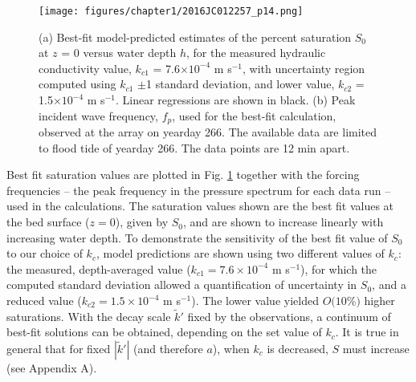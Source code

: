 \begin{figure} %
		\begin{center}	
		\noindent\texttt{[image: figures/chapter1/2016JC012257\_p14.png]}
	\caption[Best-fit saturation values: flood tide]{(a) Best-fit model-predicted estimates of the percent saturation $S_0$ at $z$ = 0 versus water depth $h$, for the measured hydraulic conductivity value, $k_{c1}$ = 7.6$\times10^{-4}$ m s$^{-1}$, with uncertainty region computed using $k_{c1}$ $\pm$1 standard deviation, and lower value, $k_{c2}$ = 1.5$\times10^{-4}$ m s$^{-1}$. Linear regressions are shown in black. (b) Peak incident wave frequency, $f_{p}$, used for the best-fit calculation, observed at the array on yearday 266. The available data are limited to flood tide of yearday 266. The data points are 12 min apart.} 
	\label{fig:S}
		\end{center}
\end{figure}


Best fit saturation values are plotted in Fig. \ref{fig:S} together with the forcing frequencies -- the peak frequency in the pressure spectrum for each data run -- used in the calculations. The saturation values shown are the best fit values at the bed surface ($z=0$), given by $S_{0}$, and are shown to increase linearly with increasing water depth. To demonstrate the sensitivity of the best fit value of $S_0$ to our choice of $k_{c}$, model predictions are shown using two different values of $k_c$: the measured, depth-averaged value ($k_{c1}=7.6\times10^{-4}$ m s$^{-1}$), for which the computed standard deviation allowed a quantification of uncertainty in $S_0$, and a reduced value ($k_{c2}=1.5\times10^{-4}$ m s$^{-1}$). The lower value yielded $O(10$\%$)$ higher saturations. With the decay scale $\tilde{k}'$ fixed by the observations, a continuum of best-fit solutions can be obtained, depending on the set value of $k_c$. It is true in general that for fixed $|\tilde{k}'|$ (and therefore $a$), when $k_c$ is decreased, $S$ must increase (see Appendix A).

